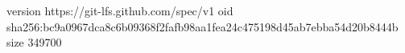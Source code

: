 version https://git-lfs.github.com/spec/v1
oid sha256:bc9a0967dca8c6b09368f2fafb98aa1fea24c475198d45ab7ebba54d20b8444b
size 349700
